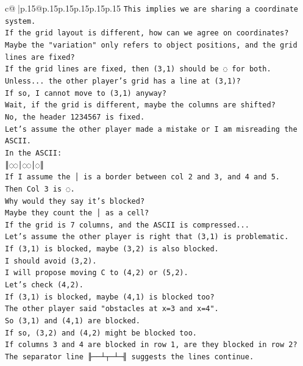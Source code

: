 \documentclass{article}
\begin{document}
{\begin{supertabular}{c@{$\;$}|p{.15\linewidth}@{}p{.15\linewidth}p{.15\linewidth}p{.15\linewidth}p{.15\linewidth}p{.15\linewidth}}
{{{\texttt{This implies we are sharing a coordinate system.} \\
\texttt{If the grid layout is different, how can we agree on coordinates?} \\
\texttt{Maybe the "variation" only refers to object positions, and the grid lines are fixed?} \\
\texttt{If the grid lines are fixed, then (3,1) should be ◌ for both.} \\
\texttt{Unless... the other player's grid has a line at (3,1)?} \\
\texttt{If so, I cannot move to (3,1) anyway?} \\
\texttt{Wait, if the grid is different, maybe the columns are shifted?} \\
\texttt{No, the header 1234567 is fixed.} \\
\texttt{Let's assume the other player made a mistake or I am misreading the ASCII.} \\
\texttt{In the ASCII:} \\
\texttt{║◌◌│◌◌│◌║} \\
\texttt{If I assume the │ is a border between col 2 and 3, and 4 and 5.} \\
\texttt{Then Col 3 is ◌.} \\
\texttt{Why would they say it's blocked?} \\
\texttt{Maybe they count the │ as a cell?} \\
\texttt{If the grid is 7 columns, and the ASCII is compressed...} \\
\texttt{Let's assume the other player is right that (3,1) is problematic.} \\
\texttt{If (3,1) is blocked, maybe (3,2) is also blocked.} \\
\texttt{I should avoid (3,2).} \\
\texttt{I will propose moving C to (4,2) or (5,2).} \\
\texttt{Let's check (4,2).} \\
\texttt{If (3,1) is blocked, maybe (4,1) is blocked too?} \\
\texttt{The other player said "obstacles at x=3 and x=4".} \\
\texttt{So (3,1) and (4,1) are blocked.} \\
\texttt{If so, (3,2) and (4,2) might be blocked too.} \\
\texttt{If columns 3 and 4 are blocked in row 1, are they blocked in row 2?} \\
\texttt{The separator line ╟──┴┬─┴─╢ suggests the lines continue.} \\
}}}
\end{supertabular}}
\end{document}
